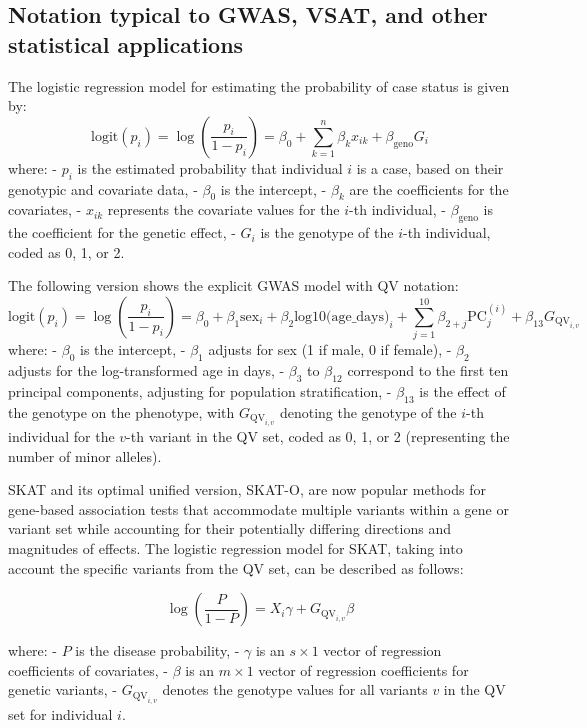 \subsection{Notation typical to GWAS, VSAT, and other statistical applications}

The logistic regression model for estimating the probability of case status is given by:
\[
\text{logit}(p_i) = \log\left(\frac{p_i}{1 - p_i}\right) = \beta_0 + \sum_{k=1}^n \beta_k x_{ik} + \beta_{\text{geno}} G_i
\]
where:
- \( p_i \) is the estimated probability that individual \( i \) is a case, based on their genotypic and covariate data,
- \( \beta_0 \) is the intercept,
- \( \beta_k \) are the coefficients for the covariates,
- \( x_{ik} \) represents the covariate values for the \( i \)-th individual,
- \( \beta_{\text{geno}} \) is the coefficient for the genetic effect,
- \( G_i \) is the genotype of the \( i \)-th individual, coded as 0, 1, or 2.

The following version shows the explicit GWAS model with QV notation:
\[
\text{logit}(p_i) = \log\left(\frac{p_i}{1 - p_i}\right) = \beta_0 + \beta_1 \text{sex}_i + \beta_2 \text{log10(age\_days)}_i + \sum_{j=1}^{10} \beta_{2+j} \text{PC}_j^{(i)} + \beta_{13} G_{\text{QV}_{i,v}}
\]
where:
- \( \beta_0 \) is the intercept,
- \( \beta_1 \) adjusts for sex (1 if male, 0 if female),
- \( \beta_2 \) adjusts for the log-transformed age in days,
- \( \beta_3 \) to \( \beta_{12} \) correspond to the first ten principal components, adjusting for population stratification,
- \( \beta_{13} \) is the effect of the genotype on the phenotype, with \( G_{\text{QV}_{i,v}} \) denoting the genotype of the \( i \)-th individual for the \( v \)-th variant in the QV set, coded as 0, 1, or 2 (representing the number of minor alleles).


SKAT and its optimal unified version, SKAT-O, are now popular methods for gene-based association tests that accommodate multiple variants within a gene or variant set while accounting for their potentially differing directions and magnitudes of effects. The logistic regression model for SKAT, taking into account the specific variants from the QV set, can be described as follows:

\[
\log \left( \frac{P}{1-P} \right) = X_i \gamma + G_{\text{QV}_{i,v}} \beta
\]

where:
- \( P \) is the disease probability,
- \( \gamma \) is an \( s \times 1 \) vector of regression coefficients of covariates,
- \( \beta \) is an \( m \times 1 \) vector of regression coefficients for genetic variants,
- \( G_{\text{QV}_{i,v}} \) denotes the genotype values for all variants \( v \) in the QV set for individual \( i \).

